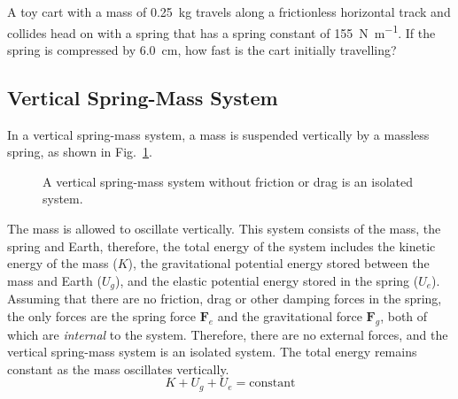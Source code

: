 \begin{example}
  A toy cart with a mass of \SI{.25}{\kilo\gram} travels
  along a frictionless horizontal track and collides head on with a spring that
  has a spring constant of \SI{155}{\newton\per\metre}. If the spring is
  compressed by \SI{6.0}{\centi\metre}, how fast is the cart initially
  travelling?
  \begin{center}
  \end{center}
\end{example}

\subsection{Vertical Spring-Mass System}
In a vertical spring-mass system, a mass is suspended vertically by a
massless spring, as shown in Fig.~\ref{fig:vspring-mass}.
\begin{figure}[ht]
  \centering
  \caption{A vertical spring-mass system without friction or drag is an
  isolated system.}
  \label{fig:vspring-mass}
\end{figure}
The mass is allowed to oscillate vertically. This system consists of the mass,
the spring and Earth, therefore, the total energy of the system includes the
kinetic energy of the mass ($K$), the gravitational potential energy stored
between the mass and Earth ($U_g$), and the elastic potential energy stored in
the spring ($U_e$). Assuming that there are no friction, drag or other damping
forces in the spring, the only forces are the spring force $\bm F_e$ and
the gravitational force $\bm F_g$, both of which are \emph{internal} to the
system. Therefore, there are no external forces, and the vertical spring-mass
system is an isolated system. The total energy remains constant as the mass
oscillates vertically.
\begin{equation}
  K + U_g + U_e=\text{constant}
\end{equation}


